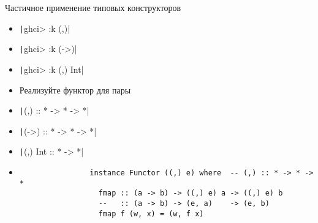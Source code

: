     \begin{frame}[fragile]{Частичное применение типовых конструкторов}
        \begin{itemize}
            \item[\todo] \texttt|ghci> :k (,)|
            \item[\todo] \texttt|ghci> :k (->)|
            \item[\todo] \texttt|ghci> :k (,) Int|
            \item[\todo] Реализуйте функтор для пары
            \item[\answer] \pause \texttt|(,) :: * -> * -> *|
            \item[\answer] \pause \texttt|(->) :: * -> * -> *|
            \item[\answer] \pause \texttt|(,) Int :: * -> *|
            \item[\answer] \pause
            \begin{verbatim}
                instance Functor ((,) e) where  -- (,) :: * -> * -> *
                  fmap :: (a -> b) -> ((,) e) a -> ((,) e) b
                  --   :: (a -> b) -> (e, a)    -> (e, b)
                  fmap f (w, x) = (w, f x)
            \end{verbatim}
        \end{itemize}
    \end{frame}




